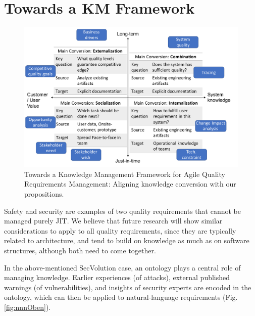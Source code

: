 \section{Towards a KM Framework}



\begin{figure}
    \centering
    \includegraphics[width=\columnwidth]{figs/km-framework}
    \caption{Towards a Knowledge Management Framework for Agile Quality Requirements Management: Aligning knowledge conversion with our propositions.}
    \label{fig:km_conversion}
\end{figure}




Safety and security are examples of two quality requirements that cannot be managed purely JIT. 
We believe that future research will show similar considerations to apply to all quality requirements, since they are typically related to architecture,  %
and tend to build on knowledge as much as on software structures, although both need to come together.

In the above-mentioned SecVolution case, an ontology plays a central role of managing knowledge. %
Earlier experiences (of attacks), external published warnings (of vulnerabilities), and  insights of security experts are encoded in the ontology, which can then be applied  %
to natural-language  requirements (Fig. \ref{fig:nnnOben}). 


